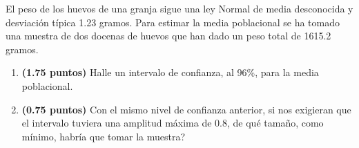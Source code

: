
El peso de los huevos de una granja sigue una ley Normal de media desconocida y desviación típica 1.23 gramos. Para estimar la media poblacional se ha tomado una muestra de dos docenas de huevos que han dado un peso total de 1615.2 gramos.
\begin{enumerate}[label=\alph*)]
\item \textbf{(1.75 puntos)} Halle un intervalo de confianza, al 96\%, para la media poblacional.
\item \textbf{(0.75 puntos)} Con el mismo nivel de confianza anterior, si nos exigieran que el intervalo tuviera una amplitud máxima de 0.8, \textquestiondown{}de qué tamaño, como mínimo, habría que tomar la muestra?
\end{enumerate}
